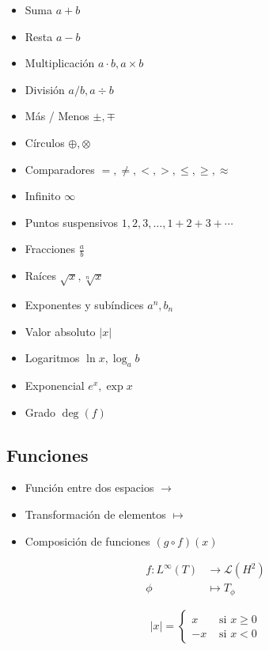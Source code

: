\documentclass{article}
\begin{document}
\begin{itemize}
    \item Suma $a+b$
    \item Resta $a-b$
    \item Multiplicación $a \cdot b, a \times b$
    \item División $a/b, a \div b$
    \item Más / Menos $\pm, \mp$
    \item Círculos $\oplus, \otimes$
    \item Comparadores $ = , \ne, <, >, \le, \ge, \approx$
    \item Infinito $\infty$
    \item Puntos suspensivos $1,2,3, \ldots, 1+2+3+\cdots$
    \item Fracciones $\displaystyle\frac{a}{b}$
    \item Raíces $\sqrt{x}, \sqrt[n]{x}$
    \item Exponentes y subíndices $a^n, b_n$
    \item Valor absoluto $|x|$
    \item Logaritmos $\ln{x}, \log_{a} b$
    \item Exponencial $e^x, \exp{x}$
    \item Grado $\deg(f)$
\end{itemize}


\subsection{Funciones}

\begin{itemize}
    \item Función entre dos espacios $\to$
    \item Transformación de elementos $\mapsto$
    \item Composición de funciones $(g\circ f) (x)$
\end{itemize}

\begin{align*} %
    f \colon L^\infty(T) &\to \mathcal{L}(H^2)\\
    \phi &\mapsto T_\phi
\end{align*}

\begin{equation*}
    |x| =
    \begin{cases}
    x &\text{ si } x\ge 0\\
    -x &\text{ si } x < 0
    \end{cases}
\end{equation*}
\end{document}
